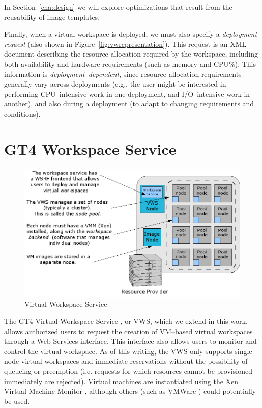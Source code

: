 In Section~\ref{cha:design} we will explore optimizations that result from the reusability of image templates.

Finally, when a virtual workspace is deployed, we must also specify a \emph{deployment request} (also shown in Figure~\ref{fig:vwrepresentation}). This request is an XML document describing the resource
allocation required by the workspace, including both availability and hardware requirements (such as memory and
CPU\%). This information is \emph{deployment--dependent}, since resource allocation requirements generally vary across deployments (e.g., the user might be interested in performing CPU--intensive work in one deployment, and I/O--intensive work in another), and also during a deployment (to adapt to changing requirements and conditions).


\section{GT4 Workspace Service}

\begin{figure}
  \begin{center}
    \includegraphics[width=\textwidth]{figures/vw_overview.png}
    \caption{Virtual Workspace Service}
	\label{fig:vwservice}
  \end{center}
\end{figure}


The GT4 Virtual Workspace Service \cite{vwsweb}, or VWS, which we extend in this work, allows authorized users to request the creation of VM--based virtual workspaces through a Web Services interface. This interface also allows users to monitor and control the virtual workspace. As of this writing, the VWS only supports single--node virtual workspaces and immediate reservations without the possibility of queueing or preemption (i.e. requests for which resources cannot be provisioned immediately  are rejected). Virtual machines are instantiated using the Xen Virtual Machine Monitor \cite{xen}, although others (such as VMWare \cite{vmwareweb}) could potentially be used.

